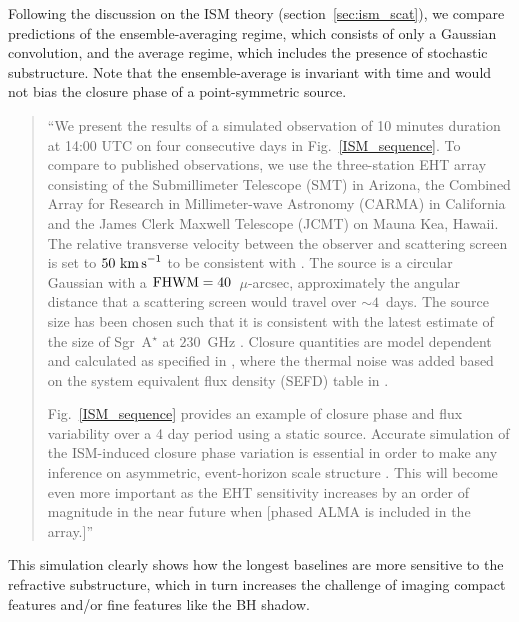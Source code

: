 Following the discussion on the ISM theory (section~\ref{sec:ism_scat}), we compare predictions of the ensemble-averaging regime, which consists of only a Gaussian convolution, and the average regime, which includes the presence of stochastic substructure. Note that the ensemble-average is invariant with time and would not bias the closure phase of a point-symmetric source.
\begin{quotation}  
``We present the results of a simulated observation of 10 minutes duration at 14:00 UTC on four consecutive days in Fig.~\ref{ISM_sequence}. To compare to published observations, we use the three-station EHT array consisting of the Submillimeter Telescope (SMT) in Arizona, the Combined Array for Research in Millimeter-wave Astronomy (CARMA) in California and the James Clerk Maxwell Telescope (JCMT) on Mauna Kea, Hawaii. The relative transverse velocity between the observer and scattering screen is set to $50~\rm{km\,s}^{-1}$ to be consistent with \citet{Ortiz_2016}. The source is a circular Gaussian with a $\rm{FHWM}=40$~$\mu$-arcsec, approximately the angular distance that a scattering screen would travel over $\sim 4$~days. The source size has been chosen such that it is consistent with the latest estimate of the size of Sgr~A$^\star$ at $230$~GHz \citep{Fish_2011}.  Closure quantities are model dependent and calculated as specified in \citet{Rogers_1995}, where the thermal noise was added based on the system equivalent flux density (SEFD) table in \citep{Lu_2014}.


Fig.~\ref{ISM_sequence} provides an example of closure phase and flux variability over a 4 day period using a static source. Accurate simulation of the ISM-induced closure phase variation is essential in order to make any inference on asymmetric, event-horizon scale structure \citep[e.g.][]{Fish_2016,Ortiz_2016}. This will become even more important as the EHT sensitivity increases by an order of magnitude in the near future when [phased ALMA is included in the array.]''
\citep{Blecher_2016} 
\end{quotation}

This simulation clearly shows how the longest baselines are more sensitive to the refractive substructure, which in turn increases the challenge of imaging compact features and/or fine features like the BH shadow. 


